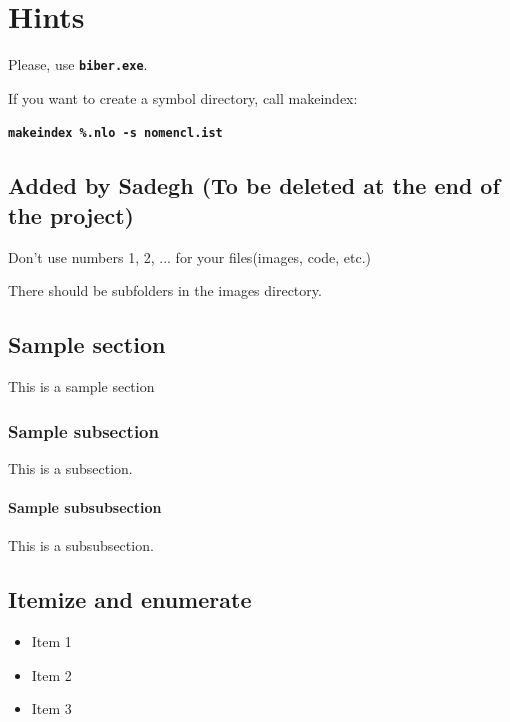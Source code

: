 %
%
%



\chapter{Hints}

Please, use  \textbf{\texttt{biber.exe}}.

\bigskip

If you want to create a symbol directory, call makeindex:


\textbf{\texttt{makeindex \%.nlo -s nomencl.ist}}


\section{Added by Sadegh (To be deleted at the end of the project)}

Don't use numbers 1, 2, ... for your files(images, code, etc.)

There should be subfolders in the images directory. 

\section{Sample section}

This is a sample section

\subsection{Sample subsection}

This is a subsection.

\subsubsection{Sample subsubsection}

This is a subsubsection.


\section{Itemize and enumerate}

\begin{itemize}
	\item Item 1
	\item Item 2
	\item Item 3
\end{itemize}

